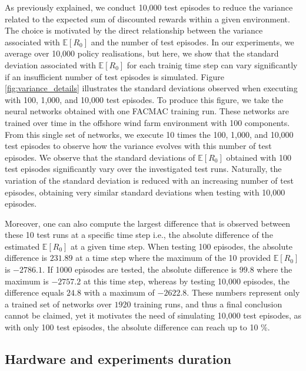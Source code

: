 As previously explained, we conduct 10,000 test episodes to reduce the variance related to the expected sum of discounted rewards within a given environment.
The choice is motivated by the direct relationship between the variance associated with $\mathbb{E}[R_{0}]$ and the number of test episodes. 
In our experiments, we average over 10,000 policy realisations, but here, we show that the standard deviation associated with $\mathbb{E}[R_{0}]$ for each trainig time step can vary significantly if an insufficient number of test episodes is simulated.
Figure \ref{fig:variance_details} illustrates the standard deviations observed when executing with 100, 1,000, and 10,000 test episodes.
To produce this figure, we take the neural networks obtained with one FACMAC training run.
These networks are trained over time in the offshore wind farm environment with 100 components.
From this single set of networks, we execute 10 times the 100, 1,000, and 10,000 test episodes to observe how the variance evolves with this number of test episodes.
We observe that the standard deviations of $\mathbb{E}[R_{0}]$ obtained with 100 test episodes significantly vary over the investigated test runs.
Naturally, the variation of the standard deviation is reduced with an increasing number of test episodes, obtaining very similar standard deviations when testing with 10,000 episodes.

Moreover, one can also compute the largest difference that is observed between these 10 test runs at a specific time step i.e., the absolute difference of the estimated $\mathbb{E}[R_{0}]$ at a given time step.
When testing 100 episodes, the absolute difference is $231.89$ at a time step where the maximum of the 10 provided $\mathbb{E}[R_{0}]$ is $ -2786.1$.
If 1000 episodes are tested, the absolute difference is $99.8$ where the maximum is $-2757.2$ at this time step, whereas by testing 10,000 episodes, the difference equals $24.8$ with a maximum of $-2622.8$.
These numbers represent only a trained set of networks over $1920$ training runs, and thus a final conclusion cannot be claimed, yet it motivates the need of simulating 10,000 test episodes, as with only 100 test episodes, the absolute difference can reach up to 10 \%.


\subsection{Hardware and experiments duration}
\label{sec:ch5_appendix_duration}

